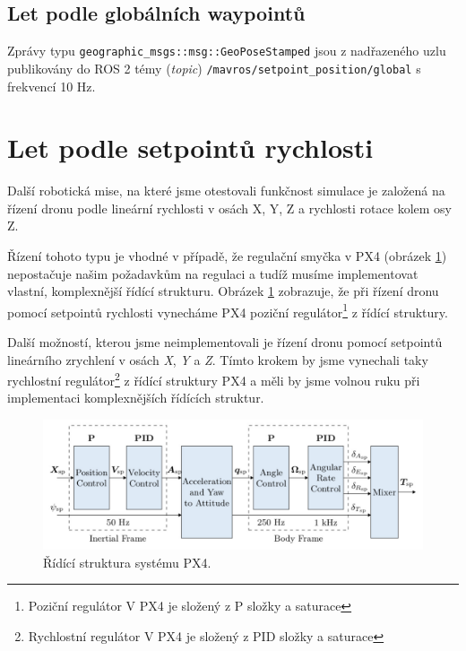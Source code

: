\subsection{Let podle globálních waypointů}

Zprávy typu \texttt{geographic\_msgs::msg::GeoPoseStamped} jsou z nadřazeného uzlu publikovány do ROS 2 témy (\textit{topic}) \texttt{/mavros/setpoint\_position/global} s frekvencí 10 Hz.

\section{Let podle setpointů rychlosti}

Další robotická mise, na které jsme otestovali funkčnost simulace je založená na řízení dronu podle lineární rychlosti v osách X, Y, Z a rychlosti rotace kolem osy Z. 

Řízení tohoto typu je vhodné v případě, že regulační smyčka v PX4 (obrázek \ref{fig:PX4controller}) nepostačuje našim požadavkům na regulaci a tudíž musíme implementovat vlastní, komplexnější řídící strukturu. Obrázek \ref{fig:PX4controller} zobrazuje, že při řízení dronu pomocí setpointů rychlosti vynecháme PX4 poziční regulátor\footnote{Poziční regulátor V PX4 je složený z P složky a saturace} z řídící struktury.

Další možností, kterou jsme neimplementovali je řízení dronu pomocí setpointů lineárního zrychlení v osách \textit{X}, \textit{Y} a \textit{Z}. Tímto krokem by jsme vynechali taky rychlostní regulátor\footnote{Rychlostní regulátor V PX4 je složený z PID složky a saturace} z řídící struktury PX4 a měli by jsme volnou ruku při implementaci komplexnějších řídících struktur.

\begin{figure}[!ht]
  \begin{center}
    \includegraphics[scale=0.44]{obrazky/PX4CONTROLLER}
  \end{center}
  \caption[Řídící struktura systému PX4]{Řídící struktura systému PX4. \cite{PX4docs}}
  \label{fig:PX4controller}
\end{figure}

